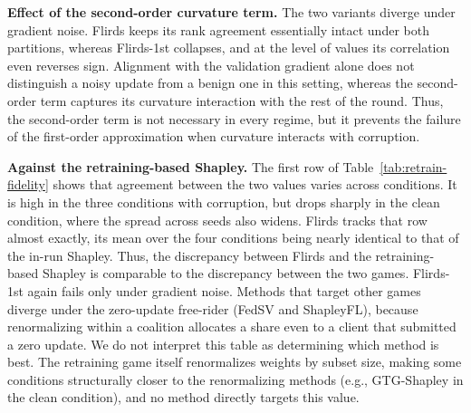 \documentclass[letterpaper]{article} %
\theoremstyle{definition} %
\newcommand{\yhha}[1]
{{\leavevmode\color{SkyBlue}[yhha:#1]}}
\begin{document}
\noindent\textbf{Effect of the second-order curvature term.}
The two variants diverge
under gradient noise. Flirds keeps its rank agreement essentially intact under
both partitions, whereas Flirds-1st collapses, and at the level of values its
correlation even reverses sign.
Alignment with the validation gradient alone does not
distinguish a noisy update from a benign one in this setting, whereas the second-order
term captures its curvature interaction with the rest of the round. Thus, the second-order term is
not necessary in every regime, but it prevents the failure of the first-order
approximation when curvature interacts with corruption.

\noindent\textbf{Against the retraining-based Shapley.}
The first row of Table~\ref{tab:retrain-fidelity} shows that agreement between
the two values varies across conditions. It is high in the three conditions
with corruption, but drops sharply in the clean condition, where the spread across
seeds also widens. Flirds tracks that row almost exactly, its mean over the
four conditions being nearly identical to that of the in-run Shapley. Thus, the discrepancy between Flirds and the retraining-based Shapley is comparable to the discrepancy between the two
games. Flirds-1st again fails only under gradient noise. Methods
that target other games diverge under the zero-update free-rider (FedSV and
ShapleyFL), because renormalizing within a coalition allocates a share even to a client that
submitted a zero update. We do not interpret this table as determining which
method is best. The retraining game itself renormalizes weights by subset
size, making some conditions structurally closer to the renormalizing methods (e.g., GTG-Shapley in the clean condition), and no method directly targets
this value.
\end{document}
